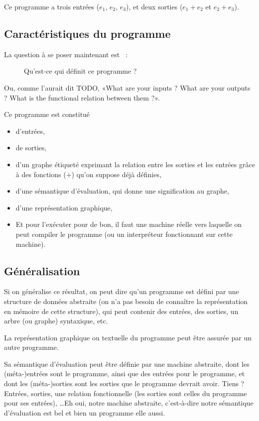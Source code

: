 \documentclass{article}
\begin{document}
Ce programme a trois entrées ($e_1$, $e_2$, $e_3$), et deux sorties ($e_1+e_2$ et $e_2+e_3$).

\subsection{Caractéristiques du programme}
La question à se poser maintenant est ~:
\begin{figure}[h!]
  \centering
  Qu'est-ce qui définit ce programme ?
\end{figure}

Ou, comme l'aurait dit TODO, «What are your inputs ? What are your outputs ? What is the functional relation between them ?».

Ce programme est constitué
\begin{itemize}
\item d'entrées,
\item de sorties,
\item d'un graphe étiqueté exprimant la relation entre les sorties et les entrées grâce à des fonctions ($+$) qu'on suppose déjà définies,
\item d'une sémantique d'évaluation, qui donne une signification au graphe,
\item d'une représentation graphique,
\item Et pour l'exécuter pour de bon, il faut une machine réelle vers laquelle on peut compiler le programme (ou un interpréteur fonctionnant sur cette machine).
\end{itemize}

\subsection{Généralisation}
Si on généralise ce résultat, on peut dire qu'un programme est défini par une structure de données abstraite (on n'a pas besoin de connaître la représentation en mémoire de cette structure), qui peut contenir des entrées, des sorties, un arbre (ou graphe) syntaxique, etc.

La représentation graphique ou textuelle du programme peut être assurée par un autre programme.

Sa sémantique d'évaluation peut être définie par une machine abstraite, dont les (méta-)entrées sont le programme, ainsi que des entrées pour le programme, et dont les (méta-)sorties sont les sorties que le programme devrait avoir. Tiens ? Entrées, sorties, une relation fonctionnelle (les sorties sont celles du programme pour ses entrées), \dots Eh oui, notre machine abstraite, c'est-à-dire notre sémantique d'évaluation est bel et bien un programme elle aussi.
\end{document}
